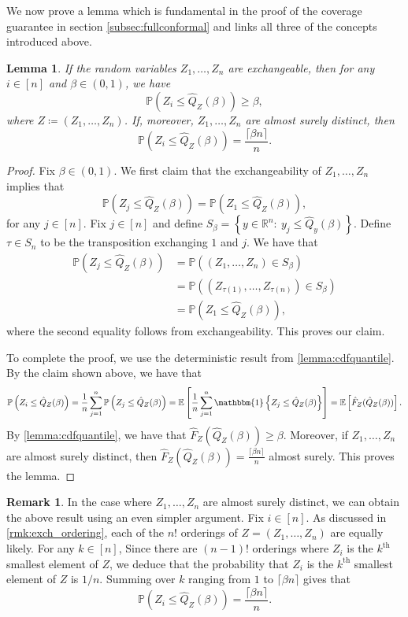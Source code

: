 \documentclass[11pt, titlepage]{article} %
\newcommand{\Prob}[1]{\mathbb{P}\left( #1 \right)}
\newcommand{\Exp}[3]{\mathbb{E}\left#2 #1 \right#3}
\newcommand{\Ind}[1]{\mathbbm{1}\left\{ #1 \right\}}
\numberwithin{equation}{section}
\newtheorem{lemma}{Lemma}
\theoremstyle{definition}
\newtheorem{remark}{Remark}
\numberwithin{theorem}{section}
\numberwithin{lemma}{section}
\numberwithin{corollary}{section}
\numberwithin{proposition}{section}
\numberwithin{definition}{section}
\numberwithin{remark}{section}
\begin{document}
\noindent
We now prove a lemma which is fundamental in the proof of the coverage guarantee in section \cref{subsec:fullconformal} and links all three of the concepts introduced above.

\begin{lemma}
    If the random variables \(Z_1, \ldots, Z_n\) are exchangeable, then for any \(i \in [n]\) and \(\beta \in (0,1)\), we have \[\Prob{Z_i \leq \hat{Q}_Z (\beta)} \geq \beta,\] where \(Z \coloneqq (Z_1, \ldots, Z_n)\). If, moreover, \(Z_1, \ldots, Z_n\) are almost surely distinct, then \[\Prob{Z_i \leq \hat{Q}_Z(\beta)} = \frac{\lceil{\beta n}\rceil}{n}.\]
\label{lemma:exch_cdfquantile}
\end{lemma}
\begin{proof}
    Fix \(\beta \in (0,1)\). We first claim that the exchangeability of \(Z_1, \ldots, Z_n\) implies that \[\Prob{Z_j \leq \hat{Q}_Z(\beta)} = \Prob{Z_1 \leq \hat{Q}_Z(\beta)}, \] for any \(j \in [n]\). Fix \(j \in [n]\) and define \(S_\beta = \left\{ y \in \mathbb{R}^n : \ y_j \leq \hat{Q}_y(\beta) \right\}.\) Define \(\tau \in S_n\) to be the transposition exchanging \(1\) and \(j\). We have that  
    \begin{align*}
        \Prob{Z_j \leq \hat{Q}_Z(\beta)} &= \Prob{(Z_1, \ldots, Z_n) \in S_\beta} \\
        &= \Prob{(Z_{\tau(1)}, \ldots, Z_{\tau(n)}) \in S_\beta} \\
        &= \Prob{Z_1 \leq \hat{Q}_Z(\beta)},
    \end{align*} where the second equality follows from exchangeability. This proves our claim. \vskip 5pt
    
    \noindent
    To complete the proof, we use the deterministic result from \cref{lemma:cdfquantile}. By the claim shown above, we have that \begin{align*}
        \Prob{Z_i \leq \hat{Q}_Z(\beta)} = \frac{1}{n} \sum_{j=1}^n \Prob{Z_j \leq \hat{Q}_Z(\beta)} = \mathbb{E} \left[ \frac{1}{n} \sum_{j=1}^n \Ind{Z_j \leq \hat{Q}_Z(\beta)} \right]
        = \Exp{\hat{F}_Z(\hat{Q}_Z(\beta))}{[}{]}.
    \end{align*} By \cref{lemma:cdfquantile}, we have that \(\hat{F}_Z(\hat{Q}_Z(\beta)) \geq \beta\). Moreover, if \(Z_1, \ldots, Z_n\) are almost surely distinct, then \(\hat{F}_Z(\hat{Q}_Z(\beta)) = \frac{\lceil{\beta n}\rceil}{n}\) almost surely. This proves the lemma.
\end{proof}

\begin{remark}
    In the case where \(Z_1, \ldots, Z_n\) are almost surely distinct, we can obtain the above result using an even simpler argument. Fix \(i \in [n]\). As discussed in \cref{rmk:exch_ordering}, each of the \(n!\) orderings of \(Z = (Z_1, \ldots, Z_n)\) are equally likely. For any \(k \in [n]\), Since there are \((n-1)!\) orderings where \(Z_i\) is the \(k^\mathrm{th}\) smallest element of \(Z\), we deduce that the probability that \(Z_i\) is the \(k^\mathrm{th}\) smallest element of \(Z\) is \(1/n\). Summing over \(k\) ranging from \(1\) to \(\lceil \beta n \rceil\) gives that \[\Prob{Z_i \leq \hat{Q}_Z(\beta)} = \frac{\lceil{\beta n}\rceil}{n}.\]
\label{rmk:exch_rank_argument}
\end{remark}
\end{document}

